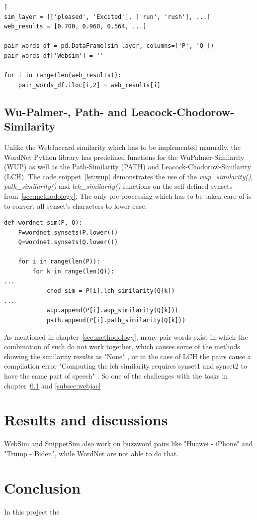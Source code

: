 \documentclass[conference]{IEEEtran}
\begin{document}
\begin{lstlisting}[frame=single, label=lst:websim, caption={}, captionpos=b]]
sim_layer = [['pleased', 'Excited'], ['run', 'rush'], ...]
web_results = [0.700, 0.960, 0.564, ...]

pair_words_df = pd.DataFrame(sim_layer, columns=['P', 'Q'])
pair_words_df['Websim'] = ''

for i in range(len(web_results)):
    pair_words_df.iloc[i,2] = web_results[i]
\end{lstlisting}

\subsection{Wu-Palmer-, Path- and Leacock-Chodorow-Similarity}\label{subsec:wup}

Unlike the WebJaccard similarity which has to be implemented manually, the WordNet Python library has predefined functions for the WuPalmer-Similarity (WUP) as well as the Path-Similarity (PATH) and Leacock-Chodorow-Similarity (LCH). The code snippet~\ref{lst:wup} demonstrates the use of the \textit{wup\_similarity()}, \textit{path\_similarity()} and \textit{lch\_similarity()} functions on the self defined synsets from~\ref{sec:methodology}. The only pre-processing which has to be taken care of is to convert all synset's characters to lower case.

\begin{lstlisting}[frame=single, label=lst:wup, caption={Use of WUP, PATH and LCH}, captionpos=b]
def wordnet_sim(P, Q):
    P=wordnet.synsets(P.lower())
    Q=wordnet.synsets(Q.lower())

    for i in range(len(P)):
        for k in range(len(Q)):
...
            chod_sim = P[i].lch_similarity(Q[k])
...
            wup.append(P[i].wup_similarity(Q[k]))
            path.append(P[i].path_similarity(Q[k]))
\end{lstlisting}

As mentioned in chapter~\ref{sec:methodology}, many pair words exist in which the combination of such do not work together, which causes some of the methods showing the similarity results as "None" \cite{perkins}, or in the case of LCH the pairs cause a compilation error "Computing the lch similarity requires synset1 and synset2 to have the same part of speech" \cite{wordnet}. So one of the challenges with the tasks in chapter~\ref{subsec:wup} and \ref{subsec:webjac}

\section{Results and discussions}\label{sec:results}

WebSim and SnippetSim also work on buzzword pairs like "Huawei - iPhone" and "Trump - Biden", while WordNet are not able to do that.

\section{Conclusion}\label{sec:conclusion}

In this project the 



 

\end{document}
